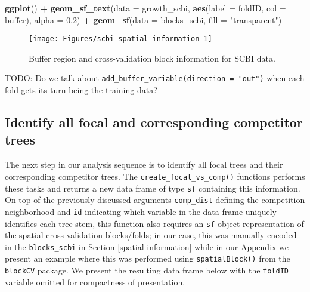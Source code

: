 \documentclass[12pt]{article}
\newenvironment{Shaded}{\begin{snugshade}}{\end{snugshade}}
\newcommand{\DataTypeTok}[1]{\textcolor[rgb]{0.13,0.29,0.53}{#1}}
\newcommand{\FloatTok}[1]{\textcolor[rgb]{0.00,0.00,0.81}{#1}}
\newcommand{\KeywordTok}[1]{\textcolor[rgb]{0.13,0.29,0.53}{\textbf{#1}}}
\newcommand{\NormalTok}[1]{#1}
\newcommand{\OperatorTok}[1]{\textcolor[rgb]{0.81,0.36,0.00}{\textbf{#1}}}
\newcommand{\StringTok}[1]{\textcolor[rgb]{0.31,0.60,0.02}{#1}}
\begin{document}
\begin{Shaded}
\begin{Highlighting}[]
\KeywordTok{ggplot}\NormalTok{() }\OperatorTok{+}
\StringTok{  }\KeywordTok{geom_sf_text}\NormalTok{(}\DataTypeTok{data =}\NormalTok{ growth_scbi, }\KeywordTok{aes}\NormalTok{(}\DataTypeTok{label =}\NormalTok{ foldID, }\DataTypeTok{col =}\NormalTok{ buffer), }
               \DataTypeTok{alpha =} \FloatTok{0.2}\NormalTok{) }\OperatorTok{+}
\StringTok{  }\KeywordTok{geom_sf}\NormalTok{(}\DataTypeTok{data =}\NormalTok{ blocks_scbi, }\DataTypeTok{fill =} \StringTok{"transparent"}\NormalTok{)}
\end{Highlighting}
\end{Shaded}

\begin{figure}

{\centering \texttt{[image: Figures/scbi-spatial-information-1]} 

}

\caption{Buffer region and cross-validation block information for SCBI data.}\label{fig:scbi-spatial-information}
\end{figure}

TODO: Do we talk about
\texttt{add\_buffer\_variable(direction\ =\ "out")} when each fold gets
its turn being the training data?

\hypertarget{identify-all-focal-and-corresponding-competitor-trees}{%
\subsection{Identify all focal and corresponding competitor
trees}\label{identify-all-focal-and-corresponding-competitor-trees}}

The next step in our analysis sequence is to identify all focal trees
and their corresponding competitor trees. The
\texttt{create\_focal\_vs\_comp()} functions performs these tasks and
returns a new data frame of type \texttt{sf} containing this
information. On top of the previously discussed arguments
\texttt{comp\_dist} defining the competition neighborhood and
\texttt{id} indicating which variable in the data frame uniquely
identifies each tree-stem, this function also requires an \texttt{sf}
object representation of the spatial cross-validation blocks/folds; in
our case, this was manually encoded in the \texttt{blocks\_scbi} in
Section \ref{spatial-information} while in our Appendix we present an
example where this was performed using \texttt{spatialBlock()} from the
\texttt{blockCV} package. We present the resulting data frame below with
the \texttt{foldID} variable omitted for compactness of presentation.
\end{document}
